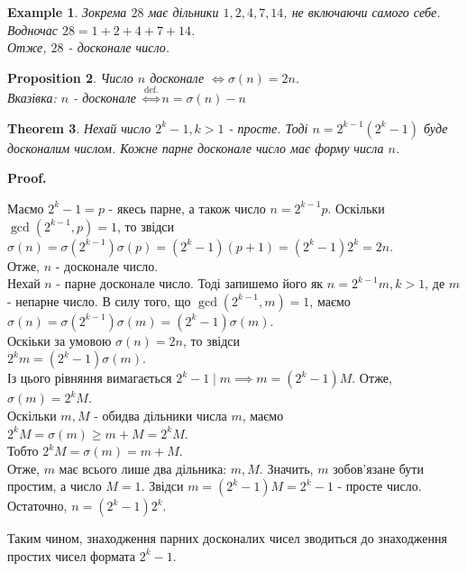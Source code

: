 \documentclass[a4paper, 10pt]{article}
\makeatletter
\theoremstyle{theoremdd}
\newtheorem{theorem}{Theorem}[subsection]
\theoremstyle{theoremdd}
\theoremstyle{theoremdd}
\theoremstyle{theoremdd}
\newtheorem{example}[theorem]{Example}
\theoremstyle{theoremdd}
\newtheorem{proposition}[theorem]{Proposition}
\theoremstyle{theoremdd}
\theoremstyle{theoremdd}
\theoremstyle{theoremdd}
\renewenvironment{proof}[1][Proof.\\]{\par
\pushQED{\hfill \qed}%
\normalfont \topsep6\p@\@plus6\p@\relax
\trivlist
\item\relax
{\bfseries
#1\@addpunct{.}}\hspace\labelsep\ignorespaces
}{%
\popQED\endtrivlist\@endpefalse
}
\makeatother
\begin{document}
\begin{example}
Зокрема $28$ має дільники $1,2,4,7,14$, не включаючи самого себе. Водночас $28 = 1 + 2 + 4 + 7 + 14$.\\
Отже, $28$ - досконале число.
\end{example}

\begin{proposition}
Число $n$ досконале $\iff \sigma(n) = 2n$.\\
\textit{Вказівка: $n$ - досконале} $\overset{\text{def.}}{\iff} n = \sigma(n)-n$
\end{proposition}

\begin{theorem}
Нехай число $2^k-1,k>1$ - просте. Тоді $n = 2^{k-1}(2^k-1)$ буде досконалим числом. Кожне парне досконале число має форму числа $n$.
\end{theorem}

\begin{proof}
Маємо $2^k-1 = p$ - якесь парне, а також число $n = 2^{k-1}p$. Оскільки $\gcd(2^{k-1},p) = 1$, то звідси\\
$\sigma(n) = \sigma(2^{k-1})\sigma(p) = (2^k-1)(p+1) = (2^k-1)2^k = 2n$.\\
Отже, $n$ - досконале число.
\bigskip \\
Нехай $n$ - парне досконале число. Тоді запишемо його як $n = 2^{k-1}m, k>1$, де $m$ - непарне число. В силу того, що $\gcd(2^{k-1},m) = 1$, маємо\\
$\sigma(n) = \sigma(2^{k-1})\sigma(m) = (2^k-1)\sigma(m)$.\\
Оскіьки за умовою $\sigma(n) = 2n$, то звідси\\
$2^k m = (2^k-1)\sigma(m)$.\\
Із цього рівняння вимагається $2^k-1 \mid m \implies m = (2^k-1)M$. Отже,\\
$\sigma(m) = 2^k M$.\\
Оскільки $m,M$ - обидва дільники числа $m$, маємо\\
$2^k M = \sigma(m) \geq m+M = 2^kM$.\\
Тобто $2^kM = \sigma(m) = m+M$.\\
Отже, $m$ має всього лише два дільника: $m,M$. Значить, $m$ зобов'язане бути простим, а число $M = 1$. Звідси $m = (2^k-1)M = 2^k-1$ - просте число. Остаточно, $n = (2^k-1)2^k$.
\end{proof}

Таким чином, знаходження парних досконалих чисел зводиться до знаходження простих чисел формата $2^k - 1$.
\end{document}
